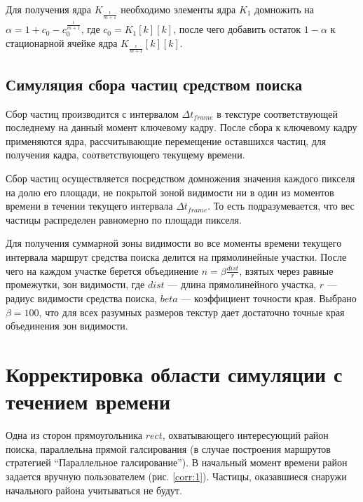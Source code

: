 Для получения ядра $K_{\frac {i} {m + 1}}$ необходимо элементы ядра $K_{1}$ домножить на
$\alpha = 1 + c_0 - c_0^{\frac {i} {m+1}}$, где $c_0 = K_{1}[k][k]$, после чего добавить 
остаток $1 - \alpha$ к стационарной ячейке ядра $K_{\frac {i} {m + 1}}[k][k]$.
\FloatBarrier
\subsection{Симуляция сбора частиц средством поиска}
Сбор частиц производится с интервалом $\Delta t_{frame}$ в текстуре соответствующей последнему
на данный момент ключевому кадру. После сбора к ключевому кадру применяются ядра,
рассчитывающие перемещение оставшихся частиц, для получения кадра, соответствующего
текущему времени.

Сбор частиц осуществляется посредством домножения значения каждого пикселя на долю его площади,
не покрытой зоной видимости ни в один из моментов времени в течении текущего интервала
$\Delta t_{frame}$. То есть подразумевается, что вес частицы распределен равномерно по площади
пикселя.

 Для получения суммарной зоны видимости во все моменты времени текущего интервала маршрут
средства поиска делится на прямолинейные участки. После чего на каждом участке берется объединение
$n = \beta \frac{dist}{r}$, взятых через равные промежутки, зон видимости, где $dist$ --- длина
прямолинейного участка, $r$ --- радиус видимости средства поиска, $beta$ --- коэффициент
точности края. Выбрано $\beta = 100$, что для всех разумных размеров текстур дает достаточно точные
края объединения зон видимости.

\FloatBarrier
\section{Корректировка области симуляции с течением времени}
\begin{figure}[ht]
  \centering
\begin{minipage}[t]{.48\textwidth}
  \centering
  \label{corr:1}
\end{minipage}
\begin{minipage}[t]{.48\textwidth}
  \centering
  \label{corr:2}
\end{minipage}
\end{figure}
Одна из сторон прямоугольника $rect$, охватывающего интересующий район поиска, параллельна прямой
галсирования (в случае построения маршрутов стратегией ``Параллельное галсирование''). 
В начальный момент времени район задается вручную пользователем (рис. \ref{corr:1}).
Частицы, оказавшиеся снаружи начального района учитываться не будут.

